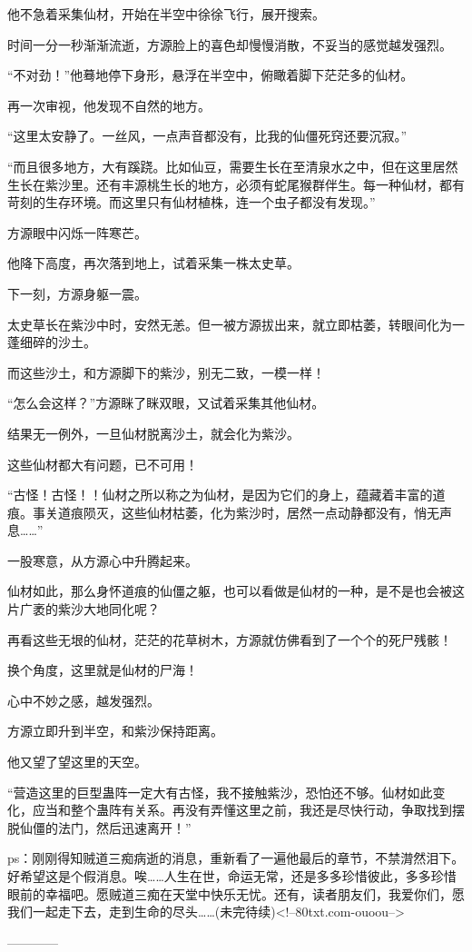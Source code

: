 \begin{this_body}
他不急着采集仙材，开始在半空中徐徐飞行，展开搜索。

时间一分一秒渐渐流逝，方源脸上的喜色却慢慢消散，不妥当的感觉越发强烈。

“不对劲！”他蓦地停下身形，悬浮在半空中，俯瞰着脚下茫茫多的仙材。

再一次审视，他发现不自然的地方。

“这里太安静了。一丝风，一点声音都没有，比我的仙僵死窍还要沉寂。”

“而且很多地方，大有蹊跷。比如仙豆，需要生长在至清泉水之中，但在这里居然生长在紫沙里。还有丰源桃生长的地方，必须有蛇尾猴群伴生。每一种仙材，都有苛刻的生存环境。而这里只有仙材植株，连一个虫子都没有发现。”

方源眼中闪烁一阵寒芒。

他降下高度，再次落到地上，试着采集一株太史草。

下一刻，方源身躯一震。

太史草长在紫沙中时，安然无恙。但一被方源拔出来，就立即枯萎，转眼间化为一蓬细碎的沙土。

而这些沙土，和方源脚下的紫沙，别无二致，一模一样！

“怎么会这样？”方源眯了眯双眼，又试着采集其他仙材。

结果无一例外，一旦仙材脱离沙土，就会化为紫沙。

这些仙材都大有问题，已不可用！

“古怪！古怪！！仙材之所以称之为仙材，是因为它们的身上，蕴藏着丰富的道痕。事关道痕陨灭，这些仙材枯萎，化为紫沙时，居然一点动静都没有，悄无声息……”

一股寒意，从方源心中升腾起来。

仙材如此，那么身怀道痕的仙僵之躯，也可以看做是仙材的一种，是不是也会被这片广袤的紫沙大地同化呢？

再看这些无垠的仙材，茫茫的花草树木，方源就仿佛看到了一个个的死尸残骸！

换个角度，这里就是仙材的尸海！

心中不妙之感，越发强烈。

方源立即升到半空，和紫沙保持距离。

他又望了望这里的天空。

“营造这里的巨型蛊阵一定大有古怪，我不接触紫沙，恐怕还不够。仙材如此变化，应当和整个蛊阵有关系。再没有弄懂这里之前，我还是尽快行动，争取找到摆脱仙僵的法门，然后迅速离开！”

ps：刚刚得知贼道三痴病逝的消息，重新看了一遍他最后的章节，不禁潸然泪下。好希望这是个假消息。唉……人生在世，命运无常，还是多多珍惜彼此，多多珍惜眼前的幸福吧。愿贼道三痴在天堂中快乐无忧。还有，读者朋友们，我爱你们，愿我们一起走下去，走到生命的尽头……(未完待续)<!--80txt.com-ouoou-->

------------

\end{this_body}

